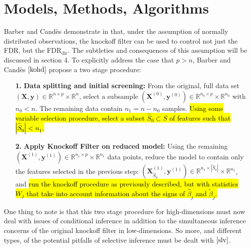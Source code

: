 \documentclass[]{scrartcl}
\newcommand{\1}[1]{\mathbbm{1}_{\left\{#1\right\}}}
\begin{document}
\section{Models, Methods, Algorithms}
Barber and Cand\`es demonstrate in \cite{kohd} that, under the assumption of normally distributed observations, the knockoff filter can be used to control not just the FDR, but the FDR$_{\text{dir}}$. The subtleties and consequences of this assumption will be discussed in section 4. To explicitly address the case that $p > n$, Barber and Cand\`es $\cite{kohd}$ propose a two stage procedure:
\begin{itemize}
	\item[\textbf{1.}]\textbf{Data splitting and initial screening:} From the original, full data set $(\mathbf{\mathbf{X}}, \mathbf{y}) \in \mathbb{R}^{n \times p} \times \mathbb{R}^{n}$, select a subsample $(\mathbf{\mathbf{X}}^{(0)}, \mathbf{y}^{(0)}) \in \mathbb{R}^{n_{0} \times p} \times \mathbb{R}^{n_{0}}$ with $n_{0} < n$. The remaining data contain $n_{1} = n - n_{0}$ samples. \hl{Using some variable selection procedure, select a subset $\widehat{S}_{0} \subset S$ of features such that $|\widehat{S}_{0}| < n_{1}$.}
	\item[\textbf{2.}]\textbf{Apply Knockoff Filter on reduced model:} Using the remaining $(\mathbf{\mathbf{X}}^{(1)}, \mathbf{y}^{(1)}) \in \mathbb{R}^{n_{1} \times p} \times \mathbb{R}^{n_{1}}$ data points, reduce the model to contain only the features selected in the previous step: $(\mathbf{\mathbf{X}}_{\widehat{S}_{0}}^{(1)}, \mathbf{y}^{(1)}) \in \mathbb{R}^{n_{1} \times |\widehat{S}_{0}|} \times \mathbb{R}^{n_{1}}$, and \hl{run the knockoff procedure as previously described, but with statistics $W_{j}$ that take into account information about the signs of $\widehat{\beta}_{j}$ and $\widetilde{\beta}_{j}$.}
\end{itemize}
One thing to note is that this two stage procedure for high-dimensions must now deal with issues of conditional inference in addition to the simultaneous inference concerns of the original knockoff filter in low-dimensions. So more, and different types, of the potential pitfalls of selective inference must be dealt with $\cite{slv}$.
\end{document}

